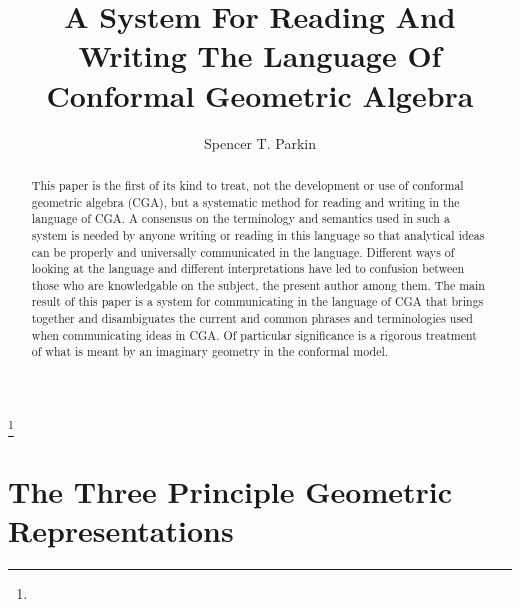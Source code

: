 \documentclass{ecgd-l}
\theoremstyle{definition}
\theoremstyle{remark}
\numberwithin{equation}{section}
\begin{document}
\title{A System For Reading And Writing The Language Of Conformal Geometric Algebra}


\author{Spencer T. Parkin}
\address{}
\curraddr{}
\thanks{}



\date{}

\dedicatory{}

\begin{abstract}
This paper is the first of its kind to treat, not the development or use of
conformal geometric algebra (CGA), but a systematic method for
reading and writing in the language of CGA.
A consensus on the terminology and
semantics used in such a system is needed by anyone writing
or reading in this language so that analytical ideas can be
properly and universally communicated in the language.  Different
ways of looking at the language and different interpretations have
led to confusion between those who are knowledgable on
the subject, the present author among them.  The main result
of this paper is a system for communicating in the language of
CGA that brings together and disambiguates the current and common phrases
and terminologies used when communicating ideas in CGA.  Of particular
significance is a rigorous treatment of what is meant by an imaginary
geometry in the conformal model.
\end{abstract}

\maketitle


\section{The Three Principle Geometric Representations}
\end{document}

